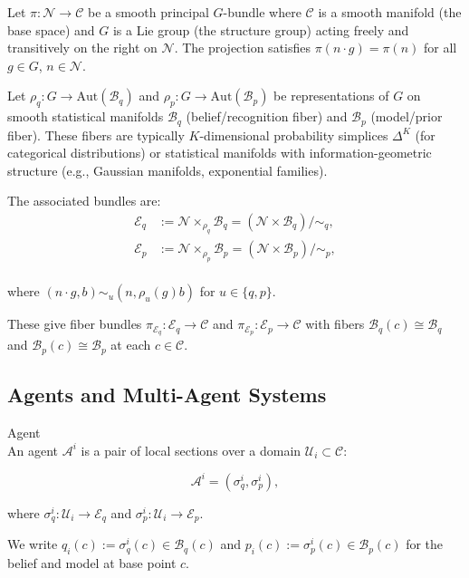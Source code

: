 \documentclass[twoside,11pt]{article}
\begin{document}
Let $\pi: \mathcal{N} \to \mathcal{C}$ be a smooth principal $G$-bundle where $\mathcal{C}$ is a smooth manifold (the base space) and $G$ is a Lie group (the structure group) acting freely and transitively on the right on $\mathcal{N}$. The projection satisfies $\pi(n \cdot g) = \pi(n)$ for all $g \in G$, $n \in \mathcal{N}$.

Let $\rho_q: G \to \text{Aut}(\mathcal{B}_q)$ and $\rho_p: G \to \text{Aut}(\mathcal{B}_p)$ be representations of $G$ on smooth statistical manifolds $\mathcal{B}_q$ (belief/recognition fiber) and $\mathcal{B}_p$ (model/prior fiber). These fibers are typically $K$-dimensional probability simplices $\Delta^K$ (for categorical distributions) or statistical manifolds with information-geometric structure (e.g., Gaussian manifolds, exponential families).

The associated bundles are:\\
\begin{align}
\mathcal{E}_q &:= \mathcal{N} \times_{\rho_q} \mathcal{B}_q = \left(\mathcal{N} \times \mathcal{B}_q\right)/\sim_q, \\
\mathcal{E}_p &:= \mathcal{N} \times_{\rho_p} \mathcal{B}_p = \left(\mathcal{N} \times \mathcal{B}_p\right)/\sim_p,
\end{align}\\
where $(n \cdot g, b) \sim_u (n, \rho_u(g)b)$ for $u \in \{q,p\}$.

These give fiber bundles $\pi_{\mathcal{E}_q}: \mathcal{E}_q \to \mathcal{C}$ and $\pi_{\mathcal{E}_p}: \mathcal{E}_p \to \mathcal{C}$ with fibers $\mathcal{B}_q(c) \cong \mathcal{B}_q$ and $\mathcal{B}_p(c) \cong \mathcal{B}_p$ at each $c \in \mathcal{C}$.

\subsection{Agents and Multi-Agent Systems}
Agent\\
An agent $\mathcal{A}^i$ is a pair of local sections over a domain $\mathcal{U}_i \subset \mathcal{C}$:

\begin{equation}
\mathcal{A}^i = \left(\sigma^i_q, \sigma^i_p\right),
\end{equation}

where $\sigma^i_q : \mathcal{U}_i \to \mathcal{E}_q$ and $\sigma^i_p : \mathcal{U}_i \to \mathcal{E}_p$.

We write $q_i(c) := \sigma^i_q(c) \in \mathcal{B}_q(c)$ and $p_i(c) := \sigma^i_p(c) \in \mathcal{B}_p(c)$ for the belief and model at base point $c$.
\end{document}
